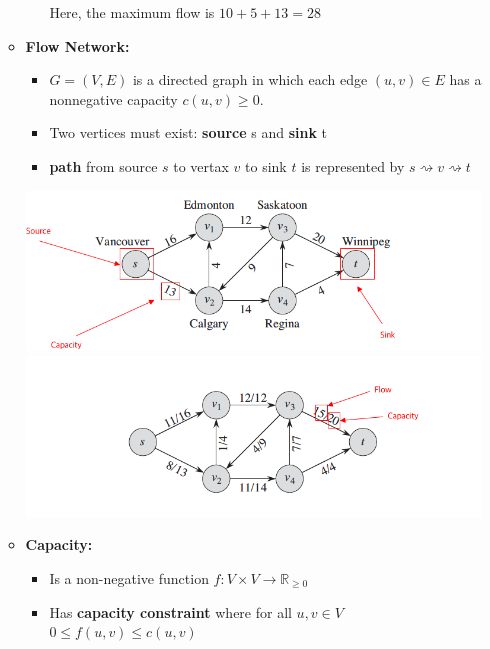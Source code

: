 \documentclass[12pt]{article}
\begin{document}
\begin{enumerate}[1.]
\begin{itemize}
\begin{itemize}
            \bigskip

            Here, the maximum flow is $10 + 5 + 13 = 28$
        \end{itemize}

        \bigskip

        \item \textbf{Flow Network:}
        \begin{itemize}
            \item $G = (V,E)$ is a directed graph in which each edge $(u,v) \in E$
            has a nonnegative capacity $c(u,v) \geq 0$.
            \item Two vertices must exist: \textbf{source} s and \textbf{sink} t
            \item \textbf{path} from source $s$ to vertax $v$ to sink $t$ is represented by $s \rightsquigarrow v \rightsquigarrow t$

        \end{itemize}

        \bigskip

        \begin{center}
        \includegraphics[width=0.9\linewidth]{images/worksheet_5_solution_1.png}
        \includegraphics[width=0.9\linewidth]{images/worksheet_5_solution_2.png}
        \end{center}

        \item \textbf{Capacity:}

        \begin{itemize}
            \item Is a non-negative function $f: V \times V \to \mathbb{R}_{\geq 0}$
            \item Has \textbf{capacity constraint} where for all $u,v \in V$ $0 \leq f(u,v) \leq c(u,v)$


\end{itemize}
\end{itemize}
\end{enumerate}
\end{document}

